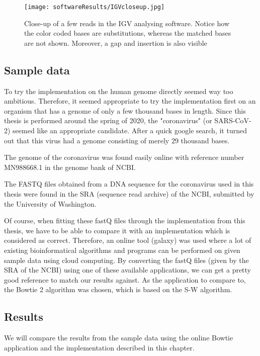 \begin{figure}[H]
	\centering
	\texttt{[image: softwareResults/IGVcloseup.jpg]}
	\caption{Close-up of a few reads in the IGV analysing software. Notice how the color coded bases are substitutions, whereas the matched bases are not shown. Moreover, a gap and insertion is also visible}
	\label{fig:IGVcloseup}
\end{figure}

\subsection{Sample data}

To try the implementation on the human genome directly seemed way too ambitious. Therefore, it seemed appropriate to try the implementation first on an organism that has a genome of only a few thousand bases in length.
Since this thesis is performed around the spring of 2020, the "coronavirus" (or SARS-CoV-2) seemed like an appropriate candidate. After a quick google search, it turned out that this virus had a genome consisting of merely 29 thousand bases.

The genome of the coronavirus was found easily online with reference number MN988668.1 in the genome bank of NCBI.\cite{11}

The FASTQ files obtained from a DNA sequence for the coronavirus used in this thesis were found in the SRA (sequence read archive) of the NCBI, submitted by the University of Washington.\cite{NCBI}

Of course, when fitting these fastQ files through the implementation from this thesis, we have to be able to compare it with an implementation which is considered as correct. Therefore, an online tool (galaxy) was used where a lot of existing bioinformatical algorithms and programs can be performed on given sample data using cloud computing.\cite{13} %
By converting the fastQ files (given by the SRA of the NCBI) using one of these available applications, we can get a pretty good reference to match our results against. As the application to compare to, the Bowtie 2 algorithm was chosen, which is based on the S-W algorithm.

\subsection{Results}

We will compare the results from the sample data using the online Bowtie application and the implementation described in this chapter.

